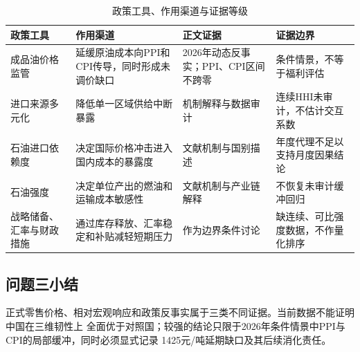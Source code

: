 \begin{table}[htbp]
  \centering
  \small
  \caption{政策工具、作用渠道与证据等级}
  \label{tab:q3-policy-evidence}
  \begin{tabularx}{0.98\textwidth}{p{}Xp{}p{}}
    \toprule
    政策工具 & 作用渠道 & 正文证据 & 证据边界 \\
    \midrule
    成品油价格监管 & 延缓原油成本向PPI和CPI传导，同时形成未调价缺口 & 2026年动态反事实；PPI、CPI区间不跨零 & 条件情景，不等于福利评估 \\
    进口来源多元化 & 降低单一区域供给中断暴露 & 机制解释与数据审计 & 连续HHI未审计，不估计交互系数 \\
    石油进口依赖度 & 决定国际价格冲击进入国内成本的暴露度 & 文献机制与国别描述 & 年度代理不足以支持月度因果结论 \\
    石油强度 & 决定单位产出的燃油和运输成本敏感性 & 文献机制与产业链解释 & 不恢复未审计缓冲回归 \\
    战略储备、汇率与财政措施 & 通过库存释放、汇率稳定和补贴减轻短期压力 & 作为边界条件讨论 & 缺连续、可比强度数据，不作量化排序 \\
    \bottomrule
  \end{tabularx}
\end{table}

\subsection{问题三小结}

正式零售价格、相对宏观响应和政策反事实属于三类不同证据。当前数据不能证明中国在三维韧性上
全面优于对照国；较强的结论只限于2026年条件情景中PPI与CPI的局部缓冲，同时必须显式记录
1425元/吨延期缺口及其后续消化责任。
